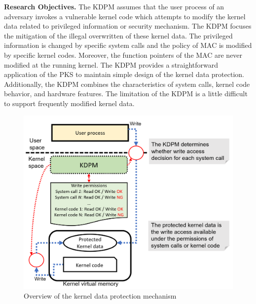 %
{\bf Research Objectives.}
The KDPM assumes that the user process of an adversary invokes a vulnerable
kernel code which attempts to modify the kernel data related to privileged
information or security mechanism.
%
The KDPM focuses the mitigation of the illegal overwritten of these kernel
data.
%
The privileged information is changed by specific system calls and the policy of
MAC is modified by specific kernel codes. Moreover, the function pointers of the MAC
are never modified at the running kernel.
%
The KDPM provides a straightforward application of the PKS to maintain simple
design of the kernel data protection. Additionally, the KDPM combines the
characteristics of system calls, kernel code behavior, and hardware features. 
%
The limitation of the KDPM is a little difficult to support frequently modified kernel data. 


\begin{figure}[tb]
  \centering        
  \includegraphics[bb=0 0 972 809, scale=.240]{./imgs/001_screenshot_2021-07-26_17.18.08.png}
  \caption{
    Overview of the kernel data protection mechanism
  }
  \label{fig:approach_overview}
\end{figure}


